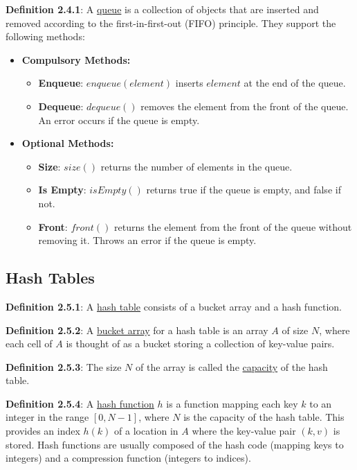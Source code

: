 \documentclass{article}
\newcommand{\separate}[1] {\vspace{#1 pt}\noindent}
\newcommand{\definition}[2]{\textbf{Definition #1}: #2\label{def:#1}}
\begin{document}
\definition{2.4.1}{A \underline{queue} is a collection of objects that are inserted and removed according to the first-in-first-out (FIFO) principle.} They support the following methods:
\begin{itemize}
    \item \textbf{Compulsory Methods:}
    \begin{itemize}
        \item \textbf{Enqueue}: \(enqueue(element)\) inserts \(element\) at the end of the queue.
        \item \textbf{Dequeue}: \(dequeue()\) removes the element from the front of the queue. An error occurs if the queue is empty.
    \end{itemize}
    \item \textbf{Optional Methods:}
    \begin{itemize}
        \item \textbf{Size}: \(size()\) returns the number of elements in the queue.
        \item \textbf{Is Empty}: \(isEmpty()\) returns true if the queue is empty, and false if not.
        \item \textbf{Front}: \(front()\) returns the element from the front of the queue without removing it. Throws an error if the queue is empty.
    \end{itemize}
\end{itemize}

\subsection{Hash Tables}

\definition{2.5.1}{A \underline{hash table} consists of a bucket array and a hash function.}

\separate{7}\definition{2.5.2}{A \underline{bucket array} for a hash table is an array \(A\) of size \(N\), where each cell of \(A\) is thought of as a bucket storing a collection of key-value pairs.} 

\separate{7}\definition{2.5.3}{The size \(N\) of the array is called the \underline{capacity} of the hash table.}

\separate{7}\definition{2.5.4}{A \underline{hash function} \(h\) is a function mapping each key \(k\) to an integer in the range \([0,N-1]\), where \(N\) is the capacity of the hash table. This provides an index \(h(k)\) of a location in \(A\) where the key-value pair \((k,v)\) is stored. Hash functions are usually composed of the hash code (mapping keys to integers) and a compression function (integers to indices).}
\end{document}
